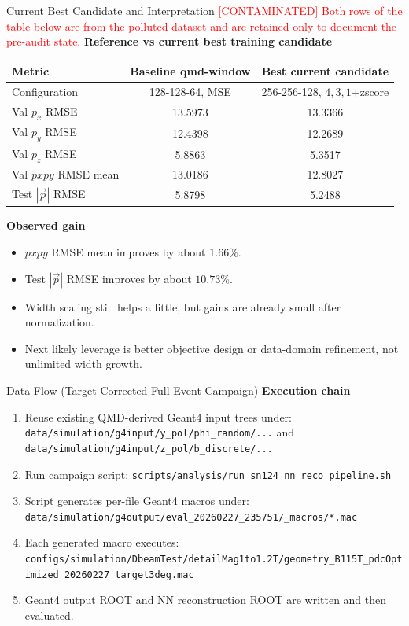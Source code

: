 \documentclass[11pt]{beamer}
\begin{document}
\begin{frame}{Current Best Candidate and Interpretation \textcolor{red}{[CONTAMINATED]}}
\textcolor{red}{Both rows of the table below are from the polluted dataset
and are retained only to document the pre-audit state.}
\textbf{Reference vs current best training candidate}
\begin{table}
\centering
\begin{tabular}{lcc}
\toprule
Metric & Baseline qmd-window & Best current candidate \\
\midrule
Configuration & 128-128-64, MSE & 256-256-128, \(4,3,1\)+zscore \\
Val \(p_x\) RMSE & 13.5973 & 13.3366 \\
Val \(p_y\) RMSE & 12.4398 & 12.2689 \\
Val \(p_z\) RMSE & 5.8863 & 5.3517 \\
Val \(pxpy\) RMSE mean & 13.0186 & 12.8027 \\
Test \(|\vec p|\) RMSE & 5.8798 & 5.2488 \\
\bottomrule
\end{tabular}
\end{table}

\textbf{Observed gain}
\begin{itemize}
\item \(pxpy\) RMSE mean improves by about \(1.66\%\).
\item Test \(|\vec p|\) RMSE improves by about \(10.73\%\).
\item Width scaling still helps a little, but gains are already small after normalization.
\item Next likely leverage is better objective design or data-domain refinement, not unlimited width growth.
\end{itemize}
\end{frame}

\begin{frame}{Data Flow (Target-Corrected Full-Event Campaign)}
\textbf{Execution chain}
\begin{enumerate}
\item Reuse existing QMD-derived Geant4 input trees under:
\texttt{data/simulation/g4input/y\_pol/phi\_random/...} and
\texttt{data/simulation/g4input/z\_pol/b\_discrete/...}
\item Run campaign script:
\texttt{scripts/analysis/run\_sn124\_nn\_reco\_pipeline.sh}
\item Script generates per-file Geant4 macros under:
\texttt{data/simulation/g4output/eval\_20260227\_235751/\_macros/*.mac}
\item Each generated macro executes:
\texttt{configs/simulation/DbeamTest/detailMag1to1.2T/geometry\_B115T\_pdcOptimized\_20260227\_target3deg.mac}
\item Geant4 output ROOT and NN reconstruction ROOT are written and then evaluated.
\end{enumerate}
\end{frame}
\end{document}
